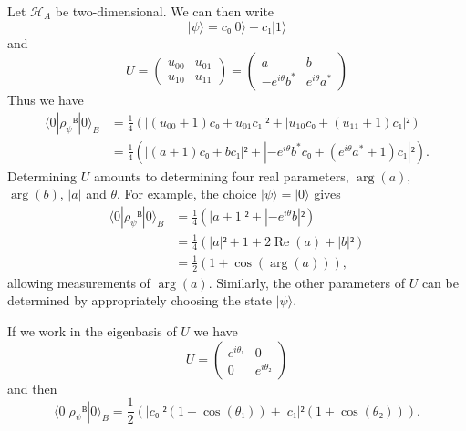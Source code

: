 \begin{example}
  Let $ℋ_A$ be two-dimensional. We can then write
  \begin{equation}
    |ψ⟩ = c₀|0⟩ + c₁|1⟩
  \end{equation}
  and
  \begin{equation}
    U =
    \begin{pmatrix}
      u_{00} & u_{01} \\
      u_{10} & u_{11}
    \end{pmatrix}
    =
    \begin{pmatrix}
      a & b \\
      -e^{iθ}b^* & e^{iθ}a^*
    \end{pmatrix}
  \end{equation}
  Thus we have
  \begin{equation}
    \begin{aligned}
      ⟨0|ρ_ψᴮ|0⟩_B
      &= \frac{1}{4} \left( |(u_{00}+1)c₀ + u_{01}c₁|² + |u_{10}c₀ + (u_{11}+1)c₁|² \right) \\
      &= \frac{1}{4} \left( |(a+1)c₀ + bc₁|² + |-e^{iθ}b^*c₀ + (e^{iθ}a^*+1)c₁|² \right).
    \end{aligned}
  \end{equation}
  Determining $U$ amounts to determining four real parameters, $\operatorname{arg}(a)$, $\operatorname{arg}(b)$, $|a|$ and $θ$. For example, the choice $|ψ⟩=|0⟩$ gives
  \begin{equation}
    \begin{aligned}
      ⟨0|ρ_ψᴮ|0⟩_B
      &= \frac{1}{4} \left( |a+1|² + |-e^{iθ}b|² \right) \\
      &= \frac{1}{4} \left( |a|² + 1 + 2\operatorname{Re}(a) + |b|² \right) \\
      &= \frac{1}{2} \left( 1 + \cos(\operatorname{arg}(a)) \right),
    \end{aligned}
  \end{equation}
  allowing measurements of $\operatorname{arg}(a)$.
  Similarly, the other parameters of $U$ can be determined by appropriately choosing the state $|ψ⟩$.

  If we work in the eigenbasis of $U$ we have
  \begin{equation}
    U =
    \begin{pmatrix}
      e^{iθ₁} & 0 \\
      0 & e^{iθ₂}
    \end{pmatrix}
  \end{equation}
  and then
  \begin{equation}
    ⟨0|ρ_ψᴮ|0⟩_B = \frac{1}{2} \left( |c₀|²(1+\cos(θ₁)) + |c₁|²(1+\cos(θ₂)) \right).
  \end{equation}
\end{example}

